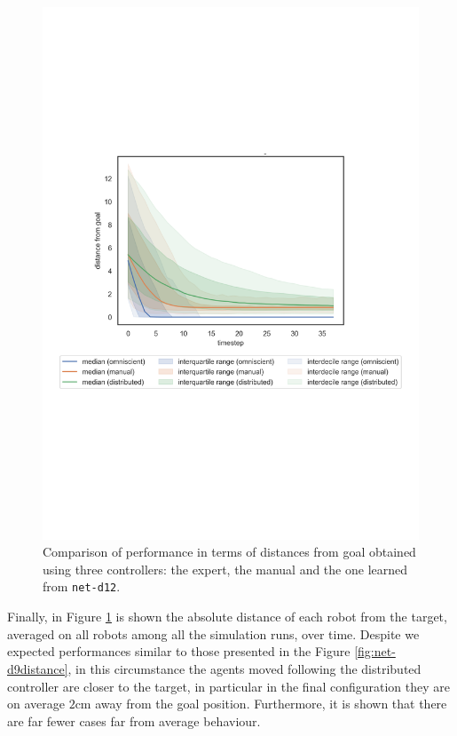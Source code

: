 \begin{figure}[!htb]
	\centering
	\includegraphics[width=.65\textwidth]{contents/images/net-d12/distances-from-goal-compressed-distributed}%
	\caption[Evaluation of \texttt{net-d1} distances from goal.]{Comparison of 
		performance in terms of distances from goal obtained using three 
		controllers: 
		the expert, the manual and the one learned from \texttt{net-d12}.}
	\label{fig:net-d12distance}
\end{figure}
Finally, in Figure \ref{fig:net-d12distance} is shown the absolute distance of 
each robot from the target, averaged on all robots among all the simulation runs, 
over time. 
Despite we expected performances similar to those presented in the Figure 
\ref{fig:net-d9distance}, in this circumstance the agents moved following the 
distributed controller are closer to the target, in particular in the final 
configuration they are on average $2$\gls{cm} away from the goal position. 
Furthermore, it is shown that there are far fewer cases far from average 
behaviour.

